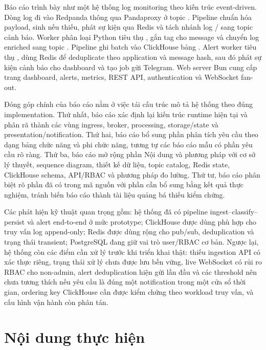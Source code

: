 Báo cáo trình bày \LogRider{} như một hệ thống log monitoring theo kiến trúc event-driven. Dòng log đi vào Redpanda thông qua Pandaproxy ở topic . Pipeline  chuẩn hóa payload, sinh  nếu thiếu, phát sự kiện  qua Redis và tách nhánh log / sang topic cảnh báo. Worker phân loại Python tiêu thụ , gắn tag cho message và chuyển log enriched sang topic . Pipeline  ghi batch vào ClickHouse bảng . Alert worker tiêu thụ , dùng Redis để deduplicate theo application và message hash, sau đó phát sự kiện cảnh báo cho dashboard và tạo job gửi Telegram. Web server Bun cung cấp trang dashboard, alerts, metrics, REST API, authentication và WebSocket fan-out.

Đóng góp chính của báo cáo nằm ở việc tái cấu trúc mô tả hệ thống theo đúng implementation. Thứ nhất, báo cáo xác định lại kiến trúc runtime hiện tại và phân rã thành các vùng ingress, broker, processing, storage/state và presentation/notification. Thứ hai, báo cáo bổ sung phần phân tích yêu cầu theo dạng bảng chức năng và phi chức năng, tương tự các báo cáo mẫu có phần yêu cầu rõ ràng. Thứ ba, báo cáo mở rộng phần Nội dung và phương pháp với cơ sở lý thuyết, sequence diagram, thiết kế dữ liệu, topic catalog, Redis state, ClickHouse schema, API/RBAC và phương pháp đo lường. Thứ tư, báo cáo phân biệt rõ phần đã có trong mã nguồn với phần cần bổ sung bằng kết quả thực nghiệm, tránh biến báo cáo thành tài liệu quảng bá thiếu kiểm chứng.

Các phát hiện kỹ thuật quan trọng gồm: hệ thống đã có pipeline ingest--classify--persist và alert end-to-end ở mức prototype; ClickHouse được dùng phù hợp cho truy vấn log append-only; Redis được dùng rộng cho pub/sub, deduplication và trạng thái transient; PostgreSQL đang giữ vai trò user/RBAC cơ bản. Ngược lại, hệ thống còn các điểm cần xử lý trước khi triển khai thật: thiếu ingestion API có xác thực riêng, trạng thái xử lý chưa được lưu bền vững, live WebSocket có rủi ro RBAC cho non-admin, alert deduplication hiện gửi lần đầu và các threshold nên chưa tương thích nếu yêu cầu là đúng một notification trong một cửa sổ thời gian, ordering key ClickHouse cần được kiểm chứng theo workload truy vấn, và cấu hình vận hành còn phân tán.

\chapter*{Nội dung thực hiện}
{}

